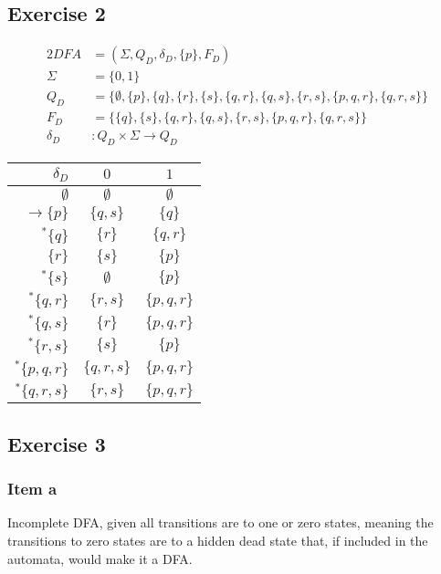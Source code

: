 {\subsection{Exercise 2}
\label{subsec:03_02}
\begin{alignat*}{2}
	DFA       &= (\Sigma, Q_D, \delta_D, \{p\}, F_D)\\
	\Sigma    &= \{0,1\}\\
	Q_D       &= \{\emptyset,\{p\},\{q\},\{r\},\{s\},\{q,r\},\{q,s\},\{r,s\},\{p,q,r\},\{q,r,s\}\}\\
	F_D       &= \{\{q\},\{s\},\{q,r\},\{q,s\},\{r,s\},\{p,q,r\},\{q,r,s\}\}\\
	\delta_D &\colon Q_D \times \Sigma \rightarrow Q_D
\end{alignat*}
\begin{center}
\begin{tabular}{ r | c c }
 $\delta_D$ & $0$ & $1$ \\
 \hline
 $\emptyset              $ & $\emptyset  $ & $\emptyset  $ \\
 $\rightarrow \{p      \}$ & $\{  q,  s\}$ & $\{  q    \}$ \\  
 $^*       \{  q    \}$ & $\{    r  \}$ & $\{  q,r  \}$ \\
 $            \{    r  \}$ & $\{      s\}$ & $\{p      \}$ \\
 $^*       \{      s\}$ & $\emptyset  $ & $\{p      \}$ \\
 $^*       \{  q,r  \}$ & $\{    r,s\}$ & $\{p,q,r  \}$ \\
 $^*       \{  q,  s\}$ & $\{    r  \}$ & $\{p,q,r  \}$ \\
 $^*       \{    r,s\}$ & $\{      s\}$ & $\{p      \}$ \\
 $^*       \{p,q,r  \}$ & $\{  q,r,s\}$ & $\{p,q,r  \}$ \\
 $^*       \{  q,r,s\}$ & $\{    r,s\}$ & $\{p,q,r  \}$
\end{tabular}
\end{center}
\subsection{Exercise 3} \label{subsec:03_03}
\subsubsection{Item a}
Incomplete DFA, given all transitions are to one or zero states, meaning the transitions to zero states are to a hidden dead state that, if included in the automata, would make it a DFA.
}
